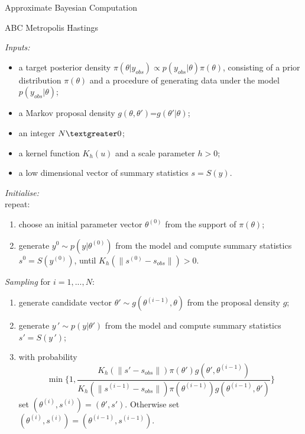 \documentclass{beamer}
\begin{document}
\begin{section}{Approximate Bayesian Computation}
	
	\begin{frame}[plain]{}
		\sectionpage
	\end{frame}
	
\begin{frame}{ABC Metropolis Hastings}
	\only<1> {
		\emph{Inputs:}
		\begin{itemize}
			\item a target posterior density $\pi(\theta | y_{obs}) \propto p(y_{obs}|\theta) \pi(\theta)$, consisting of a prior distribution $\pi(\theta)$ and a procedure of generating data under the model $p(y_{obs}|\theta)$;
			\item a Markov proposal density $g(\theta,\theta')$=$g(\theta' | \theta)$;
			\item an integer $N \textgreater0$;
			\item a kernel function $K_h(u)$ and a scale parameter $h > 0$;
			\item a low dimensional vector of summary statistics $s=S(y)$.
		\end{itemize}
		
		\emph{Initialise:} \\
		repeat:
		\begin{enumerate}
			\item choose an initial parameter vector $\theta^{(0)}$ from the support of $\pi(\theta)$;
			\item generate $ y^{0} \sim p(y|\theta ^ {(0)})$ from the model and compute summary statistics $s^{0}=S(y^{(0)})$, until ${K_h(\parallel s^{(0)}-s_{obs}\parallel)} >0$.
		\end{enumerate}
	}
	 {
		\emph{Sampling} for $i=1,...,N$:
		\begin{enumerate}
			\item generate candidate vector $\theta' \sim g(\theta^{(i-1)},\theta)$ from the proposal density $g$;
			\item generate $ y\,' \sim p(y|\theta')$ from the model and compute summary statistics  $s' = S(y\,')$;
			\item with probability $$\min \{ 1, \frac{K_h(\parallel s'-s_{obs}\parallel)   \pi(\theta')g(\theta',\theta^{(i-1)})}{K_h(\parallel s^{(i-1)}-s_{obs}\parallel)   \pi(\theta^{(i-1)})g(\theta^{(i-1)},\theta') } \}$$ 
			set $(\theta^{(i)},s^{(i)})=(	\theta',s')$. 
			Otherwise set  $(\theta^{(i)},s^{(i)})=(\theta^{(i-1)},s^{(i-1)})$.
		\end{enumerate}
		
}
\end{frame}
\end{section}
\end{document}
